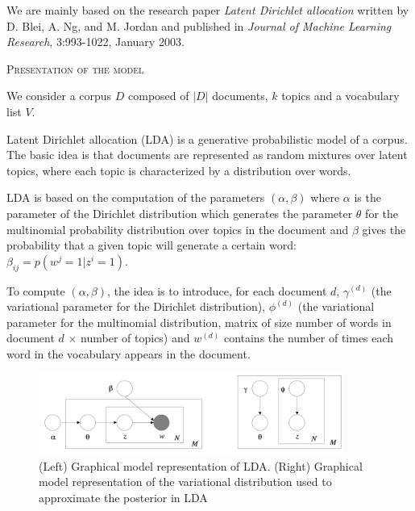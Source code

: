 \documentclass[10pt]{article}
\begin{document}
\noindent
{}

\medskip

We are mainly based on the research paper \emph{Latent Dirichlet allocation} written by D. Blei, A. Ng, and M. Jordan and published in \emph{Journal of Machine Learning Research}, 3:993-1022, January 2003.

\begin{center}
\textsc{\Large{Presentation of the model}}
\end{center}

We consider a corpus $D$ composed of $|D|$ documents, $k$ topics and a vocabulary list $V$.

Latent Dirichlet allocation (LDA) is a generative probabilistic model of a corpus. The basic idea is that documents are represented as random mixtures over latent topics, where each topic is characterized by a distribution over words. 

LDA is based on the computation of the parameters $(\alpha, \beta)$ where $\alpha$ is the parameter of the Dirichlet distribution which generates the parameter $\theta$ for the multinomial probability distribution over topics in the document and $\beta$ gives the probability that a given topic will generate a certain word: $\beta_{ij}= p(w^j = 1 | z^i = 1)$.

To compute $(\alpha, \beta)$, the idea is to introduce, for each document $d$, $\gamma^{(d)}$ (the variational parameter for the Dirichlet distribution), $\phi^{(d)}$ (the variational parameter for the multinomial distribution, matrix of size number of words in document $d$ $\times$ number of topics) and $w^{(d)}$ contains the number of times each word in the vocabulary appears in the document.

\begin{figure}[ht!]
\begin{center}
\includegraphics[width=10cm]{fig1.png}
\caption{(Left) Graphical model representation of LDA. (Right) Graphical model representation of the variational distribution used to approximate the posterior in LDA}
\end{center}
\end{figure}
\end{document}
